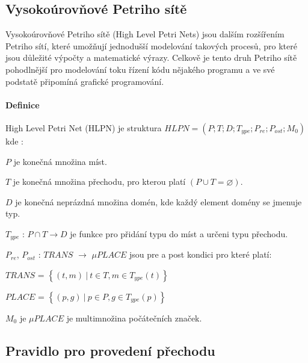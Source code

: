 \subsection{Vysokoúrovňové Petriho sítě}
\label{subsec:hlpn}

Vysokoúrovňové Petriho sítě (High Level Petri Nets) jsou dalším rozšířením Petriho sítí, které umožňují jednodušší modelování takových procesů, pro které jsou důležité výpočty a matematické výrazy. Celkově je tento druh Petriho sítě pohodlnější pro modelování toku řízení kódu nějakého programu a ve své podstatě připomíná grafické programování.

\paragraph{Definice}

High Level Petri Net (HLPN) je struktura $HLPN = \left( P; T; D; T_{ype}; P_{re}; P_{ost}; M_0\right) $ kde \cite[p.11--12]{pnstd54}:

\begin{itemize}
  \item $P$ je konečná množina míst. \\
  \item $T$ je konečná množina přechodu, pro kterou platí $\left(P \cup T = \varnothing\right)$. \\
  \item $D$ je konečná neprázdná množina domén, kde každý element domény se jmenuje typ. \\
  \item $T_{ype}$ : $P \cap T \rightarrow D$ je funkce pro přidání typu do míst a určeni typu přechodu.
  \item $P_{re}$, $P_{ost}$ : $TRANS$ $\rightarrow$ $\mu PLACE$ jsou pre a post kondici pro které platí: \\
  \begin{center}
    \item $TRANS$ = $\left\{\left(t, m\right)\:\vert\:t \in T, m \in T_{ype} \left( t \right)\right\}$ \\
    \item $PLACE$ = $\left\{\left(p, g\right)\:\vert\:p \in P, g \in T_{ype} \left( p \right)\right\}$ \\
  \end{center}
  \item $M_0$ je $\mu PLACE$ je multimnožina počátečních značek.
\end{itemize}

\subsection{Pravidlo pro provedení přechodu}
\label{subsec:graph-transition}

